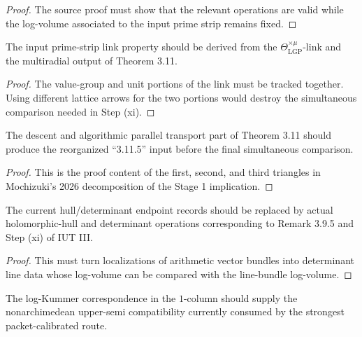 \begin{proof}
  The source proof must show that the relevant operations are valid while the
  \qPilot{} log-volume associated to the input prime strip remains fixed.
\end{proof}

\begin{theorem}
  \label{thm:construct-ipl}
  \notready
  The input prime-strip link property should be derived from the
  \(\Theta^{\times\mu}_{\mathrm{LGP}}\)-link and the multiradial output of
  Theorem 3.11.
\end{theorem}

\begin{proof}
  The value-group and unit portions of the link must be tracked together.
  Using different lattice arrows for the two portions would destroy the
  simultaneous comparison needed in Step (xi).
\end{proof}

\begin{theorem}
  \label{thm:construct-apt}
  \notready
  The descent and algorithmic parallel transport part of Theorem 3.11 should
  produce the reorganized ``3.11.5'' input before the final simultaneous
  comparison.
\end{theorem}

\begin{proof}
  This is the proof content of the first, second, and third triangles in
  Mochizuki's 2026 decomposition of the Stage 1 implication.
\end{proof}

\begin{theorem}
  \label{thm:construct-hdd}
  \notready
  The current hull/determinant endpoint records should be replaced by actual
  holomorphic-hull and determinant operations corresponding to Remark 3.9.5
  and Step (xi) of IUT III.
\end{theorem}

\begin{proof}
  This must turn localizations of arithmetic vector bundles into determinant
  line data whose log-volume can be compared with the \qPilot{} line-bundle
  log-volume.
\end{proof}

\begin{theorem}
  \label{thm:construct-log-kummer-upper-semi}
  \notready
  The log-Kummer correspondence in the \(1\)-column should supply the
  nonarchimedean upper-semi compatibility currently consumed by the strongest
  packet-calibrated route.
\end{theorem}

